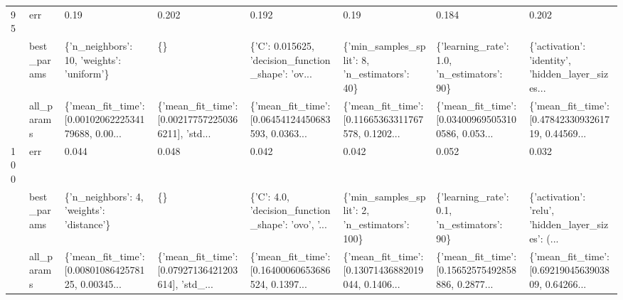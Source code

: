 \begin{tabular}{llllllll}
95  & err &                                               0.19 &                                              0.202 &                                              0.192 &                                               0.19 &                                              0.184 &                                              0.202 \\
    & best\_params &          \{'n\_neighbors': 10, 'weights': 'uniform'\} &                                                 \{\} &  \{'C': 0.015625, 'decision\_function\_shape': 'ov... &       \{'min\_samples\_split': 8, 'n\_estimators': 40\} &         \{'learning\_rate': 1.0, 'n\_estimators': 90\} &  \{'activation': 'identity', 'hidden\_layer\_sizes... \\
    & all\_params &  \{'mean\_fit\_time': [0.0010206222534179688, 0.00... &  \{'mean\_fit\_time': [0.002177572250366211], 'std... &  \{'mean\_fit\_time': [0.06454124450683593, 0.0363... &  \{'mean\_fit\_time': [0.11665363311767578, 0.1202... &  \{'mean\_fit\_time': [0.034009695053100586, 0.053... &  \{'mean\_fit\_time': [0.4784233093261719, 0.44569... \\
100 & err &                                              0.044 &                                              0.048 &                                              0.042 &                                              0.042 &                                              0.052 &                                              0.032 \\
    & best\_params &          \{'n\_neighbors': 4, 'weights': 'distance'\} &                                                 \{\} &  \{'C': 4.0, 'decision\_function\_shape': 'ovo', '... &      \{'min\_samples\_split': 2, 'n\_estimators': 100\} &         \{'learning\_rate': 0.1, 'n\_estimators': 90\} &  \{'activation': 'relu', 'hidden\_layer\_sizes': (... \\
    & all\_params &  \{'mean\_fit\_time': [0.0080108642578125, 0.00345... &  \{'mean\_fit\_time': [0.07927136421203614], 'std\_... &  \{'mean\_fit\_time': [0.16400060653686524, 0.1397... &  \{'mean\_fit\_time': [0.13071436882019044, 0.1406... &  \{'mean\_fit\_time': [0.15652575492858886, 0.2877... &  \{'mean\_fit\_time': [0.6921904563903809, 0.64266... \\
\bottomrule
\end{tabular}
